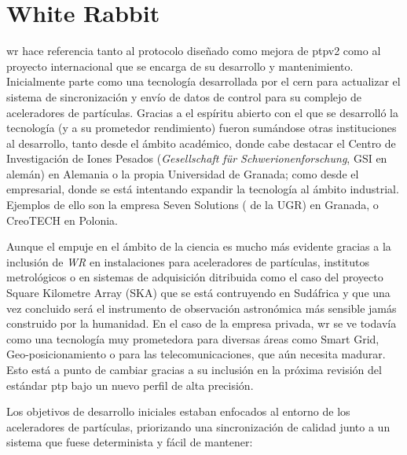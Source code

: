 \section{White Rabbit}

\acrfull{wr} hace referencia tanto al protocolo diseñado como mejora de 
\gls{ptp}v2 como al proyecto internacional que se encarga de su desarrollo y 
mantenimiento. Inicialmente parte como una tecnología desarrollada por el 
\gls{cern} para actualizar el sistema de sincronización y envío de datos de 
control para su complejo de aceleradores de partículas. Gracias a el espíritu 
abierto con el que se desarrolló la tecnología (y a su prometedor rendimiento) 
fueron sumándose otras instituciones al desarrollo, tanto desde el ámbito 
académico, donde cabe destacar el Centro de Investigación de Iones Pesados 
(\textit{Gesellschaft für Schwerionenforschung}, GSI en alemán) en Alemania o 
la propia Universidad de Granada; como desde el empresarial, donde se está 
intentando expandir la tecnología al ámbito industrial. Ejemplos de ello son la 
empresa Seven Solutions ( de la UGR) en Granada, o CreoTECH en 
Polonia. 

Aunque el empuje en el ámbito de la ciencia es mucho más 
evidente gracias a la inclusión de \textit{WR} en instalaciones para 
aceleradores de partículas, institutos metrológicos o en sistemas de 
adquisición ditribuida como el caso del proyecto Square Kilometre Array (SKA) 
que se está contruyendo en Sudáfrica y que una vez concluido será el 
instrumento de observación astronómica más sensible jamás construido por la 
humanidad. En el caso de la empresa privada, \gls{wr} se ve todavía como una 
tecnología muy prometedora para diversas áreas como Smart Grid, 
Geo-posicionamiento o para las telecomunicaciones, que aún necesita madurar. 
Esto está a punto de cambiar gracias a su inclusión en la próxima revisión del 
estándar \gls{ptp} bajo un nuevo perfil de alta precisión.

Los objetivos de desarrollo iniciales estaban enfocados al entorno de los 
aceleradores de partículas, priorizando una sincronización de calidad junto a 
un sistema que fuese determinista y fácil de mantener:

